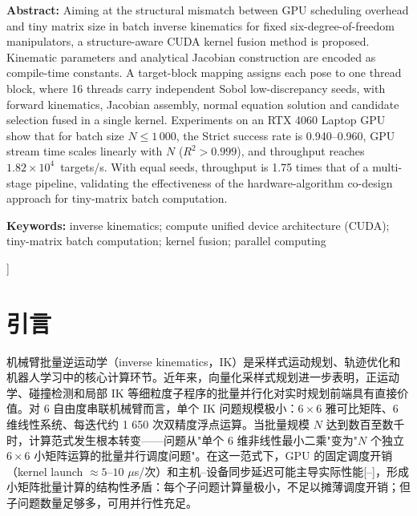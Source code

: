 \documentclass[twocolumn,a4paper,10pt]{ctexart}
\begin{document}
{\begin{minipage}{0.91\textwidth}
{\bfseries Abstract:} Aiming at the structural mismatch between GPU scheduling overhead and tiny matrix size in batch inverse kinematics for fixed six-degree-of-freedom manipulators, a structure-aware CUDA kernel fusion method is proposed. Kinematic parameters and analytical Jacobian construction are encoded as compile-time constants. A target-block mapping assigns each pose to one thread block, where 16 threads carry independent Sobol low-discrepancy seeds, with forward kinematics, Jacobian assembly, normal equation solution and candidate selection fused in a single kernel. Experiments on an RTX 4060 Laptop GPU show that for batch size $N\le1\,000$, the Strict success rate is 0.940--0.960, GPU stream time scales linearly with $N$ ($R^2>0.999$), and throughput reaches $1.82\times10^4$~targets/s. With equal seeds, throughput is 1.75 times that of a multi-stage pipeline, validating the effectiveness of the hardware-algorithm co-design approach for tiny-matrix batch computation.
\par\vspace{2mm}
{\bfseries Keywords:} inverse kinematics; compute unified device architecture (CUDA); tiny-matrix batch computation; kernel fusion; parallel computing\par
\end{minipage}\par
}]

\setcounter{section}{-1}
\section{引言}

机械臂批量逆运动学（inverse kinematics，IK）是采样式运动规划、轨迹优化和机器人学习中的核心计算环节\cite{siciliano2010robotics,lynch2017modern,lavalle2006planning,sucan2012ompl}。近年来，向量化采样式规划进一步表明，正运动学、碰撞检测和局部 IK 等细粒度子程序的批量并行化对实时规划前端具有直接价值\cite{thomason2024vamp}。对 6 自由度串联机械臂而言，单个 IK 问题规模极小：$6\times6$ 雅可比矩阵、6 维线性系统、每迭代约 1 650 次双精度浮点运算。当批量规模 $N$ 达到数百至数千时，计算范式发生根本转变——问题从"单个 6 维非线性最小二乘"变为"$N$ 个独立 $6\times6$ 小矩阵运算的批量并行调度问题"。在这一范式下，GPU 的固定调度开销（kernel launch $\approx5$--$10$ $\mu$s/次）和主机--设备同步延迟可能主导实际性能[--]，形成小矩阵批量计算的结构性矛盾：每个子问题计算量极小，不足以摊薄调度开销；但子问题数量足够多，可用并行性充足。
\end{document}
